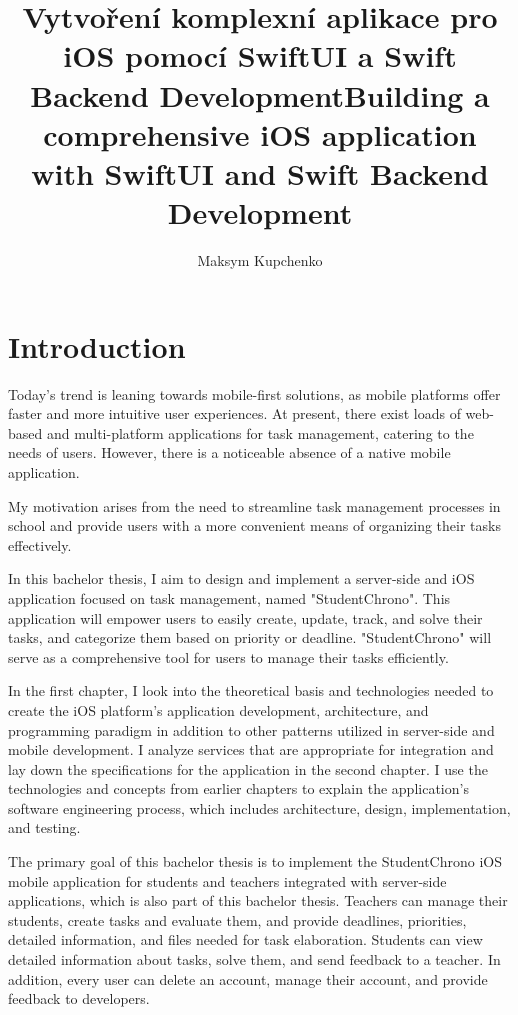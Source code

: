 \documentclass[
  biblatex = false,
  language=english,
  figures=false,
  sourcecodes,
  glossaries,
  index
]{kidiplom}
\title[czech]{Vytvoření komplexní aplikace pro iOS pomocí SwiftUI a Swift Backend Development}
\title[english]{Building a comprehensive iOS application with SwiftUI and Swift Backend Development}
\author{Maksym Kupchenko}
\begin{document}
\maketitle




\section{Introduction}

Today's trend is leaning towards mobile-first solutions, as mobile platforms offer faster and more intuitive user experiences. At present, there exist loads of web-based and multi-platform applications for task management, catering to the needs of users. However, there is a noticeable absence of a native mobile application.

My motivation arises from the need to streamline task management processes in school and provide users with a more convenient means of organizing their tasks effectively.

In this bachelor thesis, I aim to design and implement a server-side and iOS application focused on task management, named "StudentChrono". This application will empower users to easily create, update, track, and solve their tasks, and categorize them based on priority or deadline. "StudentChrono" will serve as a comprehensive tool for users to manage their tasks efficiently.

In the first chapter, I look into the theoretical basis and technologies needed to create the iOS platform's application development, architecture, and programming paradigm in addition to other patterns utilized in server-side and mobile development. I analyze services that are appropriate for integration and lay down the specifications for the application in the second chapter. I use the technologies and concepts from earlier chapters to explain the application's software engineering process, which includes architecture, design, implementation, and testing.

The primary goal of this bachelor thesis is to implement the StudentChrono iOS mobile application for students and teachers integrated with server-side applications, which is also part of this bachelor thesis. Teachers can manage their students, create tasks and evaluate them, and provide deadlines, priorities, detailed information, and files needed for task elaboration. Students can view detailed information about tasks, solve them, and send feedback to a teacher. In addition, every user can delete an account, manage their account, and provide feedback to developers.
\end{document}
